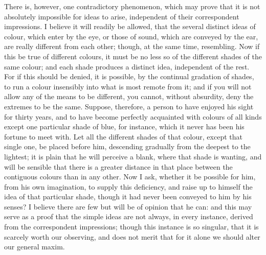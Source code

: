 \documentclass[]{article}
\begin{document}
\begin{sectionbody}
\humeparagraph  There is, however, one contradictory phenomenon, which may prove that it is not absolutely impossible for ideas to arise, independent of their correspondent impressions. I believe it will readily be allowed, that the several distinct ideas of colour, which enter by the eye, or those of sound, which are conveyed by the ear, are really different from each other; though, at the same time, resembling. Now if this be true of different colours, it must be no less so of the different shades of the same colour; and each shade produces a distinct idea, independent of the rest. For if this should be denied, it is possible, by the continual gradation of shades, to run a colour insensibly into what is most remote from it; and if you will not allow any of the means to be different, you cannot, without absurdity, deny the extremes to be the same. Suppose, therefore, a person to have enjoyed his sight for thirty years, and to have become perfectly acquainted with colours of all kinds except one particular shade of blue, for instance, which it never has been his fortune to meet with. Let all the different shades of that colour, except that single one, be placed before him, descending gradually from the deepest to the lightest; it is plain that he will perceive a blank, where that shade is wanting, and will be sensible that there is a greater distance in that place between the contiguous colours than in any other. Now I ask, whether it be possible for him, from his own imagination, to supply this deficiency, and raise up to himself the idea of that particular shade, though it had never been conveyed to him by his senses? I believe there are few but will be of opinion that he can: and this may serve as a proof that the simple ideas are not always, in every instance, derived from the correspondent impressions; though this instance is so singular, that it is scarcely worth our observing, and does not merit that for it alone we should alter our general maxim.


\end{sectionbody}
\end{document}
